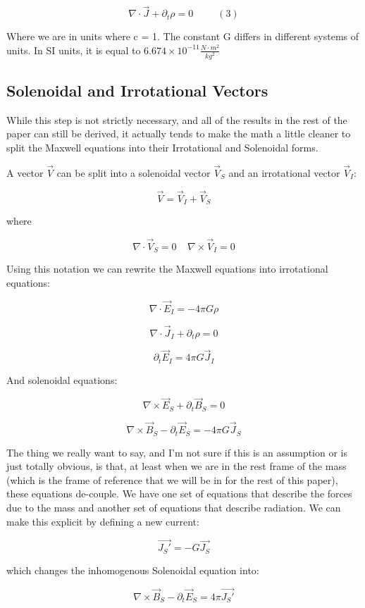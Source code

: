 \documentclass {article}
\begin{document}
$$\nabla \cdot \vec J + \partial_t \rho = 0 ~~~~~~~~~~~ (3)$$

Where we are in units where c = 1. The constant G differs in different systems of units. In SI units, it is equal to $6.674 \times 10^{-11} \frac {N \cdot m^2}{kg^2}$ 

\newpage 
\subsection{Solenoidal and Irrotational Vectors}
While this step is not strictly necessary, and all of the results in the rest of the paper can still be derived, it actually tends to make the math a little cleaner to split the Maxwell equations into their Irrotational and Solenoidal forms.

A vector $\vec V$ can be split into a solenoidal vector $\vec V_S$ and an irrotational vector $\vec V_I$:

$$\vec V = \vec V_I + \vec V_S $$

where

$$\nabla \cdot \vec V_S = 0 ~~~~~ \nabla \times \vec V_I = 0 $$

Using this notation we can rewrite the Maxwell equations into irrotational equations:

$$\nabla \cdot \vec E_I = -4 \pi G  \rho$$

$$\nabla \cdot \vec J_I + \partial_t \rho = 0 $$

$$ \partial_t \vec E_I = 4 \pi G \vec J_I $$

And solenoidal equations:

$$\nabla \times \vec E_S + \partial_t \vec B_S = 0 $$

$$\nabla \times \vec B_S - \partial_t \vec E_S =  - 4 \pi G \vec J_S$$

The thing we really want to say, and I'm not sure if this is an assumption or is just totally obvious, is that, at least when we are in the rest frame of the mass (which is the frame of reference that we will be in for the rest of this paper), these equations de-couple. We have one set of equations that describe the forces due to the mass and another set of equations that describe radiation. We can make this explicit by defining a new current:

$$\vec {J_S'} = - G \vec {J_S}$$

which changes the inhomogenous Solenoidal equation into:

$$\nabla \times \vec B_S - \partial_t \vec E_S =  4 \pi \vec {J_S'} $$
\end{document}
